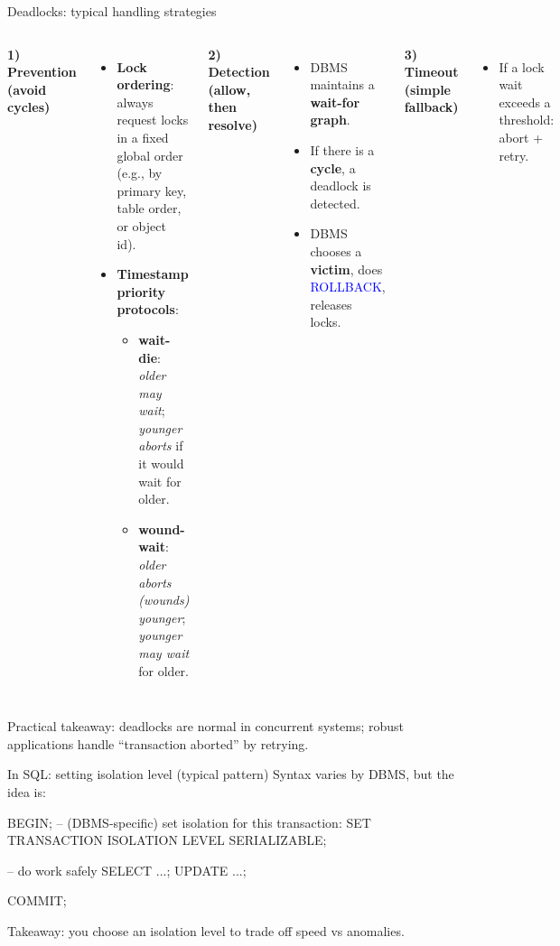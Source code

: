 \documentclass[10pt,aspectratio=169]{beamer}
\newcommand{\sqlk}[1]{\textcolor{blue}{#1}}
\begin{document}
\begin{frame}{Deadlocks: typical handling strategies}
\small
\begin{columns}[T,onlytextwidth]
\textbf{1) Prevention (avoid cycles)}
\begin{itemize}
  \item \textbf{Lock ordering}: always request locks in a fixed global order\\
        (e.g., by primary key, table order, or object id).
  \item \textbf{Timestamp priority protocols}:
  \begin{itemize}
    \item \textbf{wait-die}: \emph{older may wait}; \emph{younger aborts} if it would wait for older.
    \item \textbf{wound-wait}: \emph{older aborts (wounds) younger}; \emph{younger may wait} for older.
  \end{itemize}
\end{itemize}

\textbf{2) Detection (allow, then resolve)}
\begin{itemize}
  \item DBMS maintains a \textbf{wait-for graph}.
  \item If there is a \textbf{cycle}, a deadlock is detected.
  \item DBMS chooses a \textbf{victim}, does \sqlk{ROLLBACK}, releases locks.
\end{itemize}

\vspace{1mm}
\textbf{3) Timeout (simple fallback)}
\begin{itemize}
  \item If a lock wait exceeds a threshold: abort + retry.
\end{itemize}
\end{columns}

\vspace{1mm}
\footnotesize
Practical takeaway: deadlocks are normal in concurrent systems; robust applications handle “transaction aborted” by retrying.
\end{frame}



\begin{frame}[fragile]{In SQL: setting isolation level (typical pattern)}
\small
Syntax varies by DBMS, but the idea is:

\vspace{1mm}
\begin{codesql}
BEGIN;
-- (DBMS-specific) set isolation for this transaction:
SET TRANSACTION ISOLATION LEVEL SERIALIZABLE;

-- do work safely
SELECT ...;
UPDATE ...;

COMMIT;
\end{codesql}

\vspace{1mm}
\footnotesize Takeaway: you choose an isolation level to trade off speed vs anomalies.
\end{frame}
\end{document}
